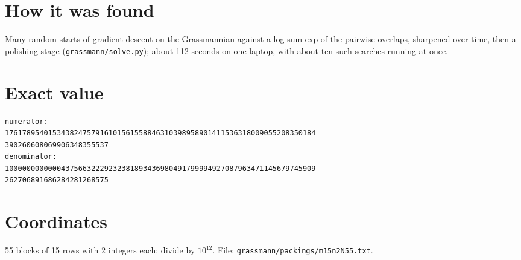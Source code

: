 \documentclass[11pt,a4paper]{article}
\begin{document}
\section{How it was found}
Many random starts of gradient descent on the Grassmannian against a log-sum-exp of the pairwise overlaps, sharpened over time, then a polishing stage (\texttt{grassmann/solve.py}); about 112 seconds on one laptop, with about ten such searches running at once.


\appendix
\section{Exact value}
{\small
\begin{verbatim}
numerator:
176178954015343824757916101561558846310398958901411536318009055208350184
390260608069906348355537
denominator:
100000000000043756632229232381893436980491799994927087963471145679745909
262706891686284281268575
\end{verbatim}}

\section{Coordinates}
55 blocks of 15 rows with 2 integers each; divide by $10^{12}$. File: \texttt{grassmann/packings/m15n2N55.txt}.
{\tiny
\begin{multicols}{4}
\end{multicols}}
\end{document}
